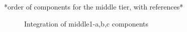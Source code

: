 \documentclass[table, 12pt]{article}
\begin{document}
*order of components for the middle tier, with references*
\begin{figure}[H]
    \centering
    \qquad\qquad
    \qquad\qquad
    \caption{Integration of middle1-a,b,c components}%
    \label{fig: integration_RankingManager_HelpRequestManager}%
\end{figure}
\end{document}
